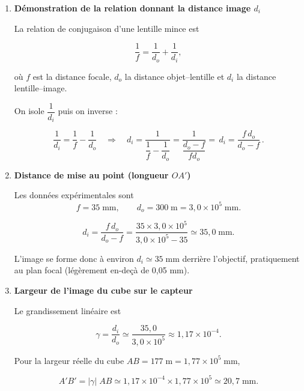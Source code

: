 \documentclass[answers]{exam}
\begin{document}
\begin{questions}
\begin{solution}

\begin{enumerate}[label=\textbf{(\alph*)}]
  \item  \textbf{Démonstration de la relation donnant la distance image $d_i$}

        La relation de conjugaison d’une lentille mince est  

        \[
          \frac{1}{f}=\frac{1}{d_o}+\frac{1}{d_i},
        \]

        où  
        $f$ est la distance focale,  
        $d_o$ la distance objet–lentille et  
        $d_i$ la distance lentille–image.  

        On isole $\dfrac{1}{d_i}$ puis on inverse :

        \[
        \frac{1}{d_i}= \frac{1}{f}-\frac{1}{d_o}
        \quad\Longrightarrow\quad
        d_i=\frac{1}{\dfrac{1}{f}-\dfrac{1}{d_o}}
        =\frac{1}{\dfrac{d_o-f}{fd_o}}
        =\boxed{\,\displaystyle d_i=\frac{f\,d_o}{d_o-f}\, }.
        \]

  \item  \textbf{Distance de mise au point (longueur $OA'$)}

        Les données expérimentales sont  
        \[
          f=35\;\text{mm},\qquad  
          d_o = 300\;\text{m}=3,0\times10^{5}\;\text{mm}.
        \]

        \[
          d_i=\frac{f\,d_o}{d_o-f}
               =\frac{35\times3,0\times10^{5}}{3,0\times10^{5}-35}
               \simeq 35{,}0\; \text{mm}.
        \]

        L’image se forme donc à environ \(\boxed{d_i\simeq 35\;\text{mm}}\) derrière l’objectif, pratiquement au plan focal (légèrement en-deçà de 0,05 mm).

  \item  \textbf{Largeur de l’image du cube sur le capteur}

        Le grandissement linéaire est  

        \[
          \gamma = \frac{d_i}{d_o}\simeq\frac{35{,}0}{3,0\times10^{5}}
          \approx 1,17\times10^{-4}.
        \]

        Pour la largeur réelle du cube  
        \(AB = 177\;\text{m}=1,77\times10^{5}\;\text{mm}\),

        \[
          A'B' = |\gamma|\;AB 
          \simeq 1,17\times10^{-4}\times1,77\times10^{5}
          \simeq \boxed{20,7\;\text{mm}}.
        \]


\end{enumerate}
\end{solution}
\end{questions}
\end{document}

